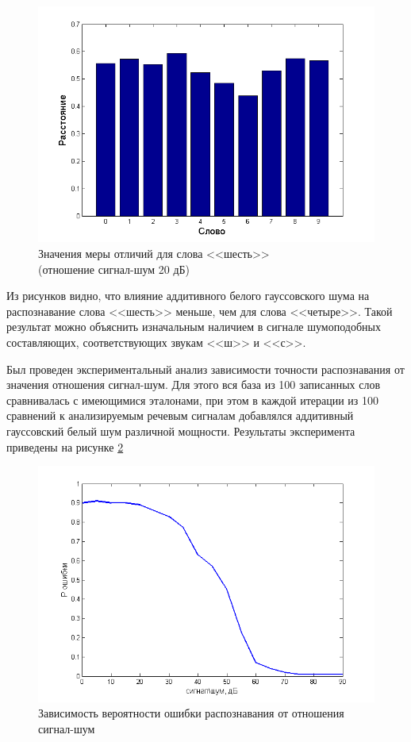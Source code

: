 \documentclass[a4paper,14pt,russian,utf8,nocolumnsxix,nocolumnxxxi,nocolumnxxxii]{eskdtext}
\begin{document}
\begin{figure}[H]	
	\centering
	\includegraphics[width=120mm]{20db_6.png}			
	\caption{Значения меры отличий для слова <<шесть>> \\ (отношение сигнал-шум 20 дБ)}
	\label{20db_6}
\end{figure}

Из рисунков видно, что влияние аддитивного белого гауссовского шума на распознавание слова <<шесть>> меньше, чем для слова <<четыре>>. Такой результат можно объяснить изначальным наличием в сигнале шумоподобных составляющих, соответствующих звукам <<ш>> и <<с>>.

Был проведен экспериментальный анализ зависимости точности распознавания от значения отношения сигнал-шум. Для этого вся база из 100 записанных слов сравнивалась с имеющимися эталонами, при этом в каждой итерации из 100 сравнений к анализируемым речевым сигналам добавлялся аддитивный гауссовский белый шум различной мощности. Результаты эксперимента приведены на рисунке \ref{snr-err}

\begin{figure}[H]	
	\centering
	\includegraphics[width=120mm]{snr-err.png}			
	\caption{Зависимость вероятности ошибки распознавания от отношения сигнал-шум}
	\label{snr-err}
\end{figure}
\end{document}
